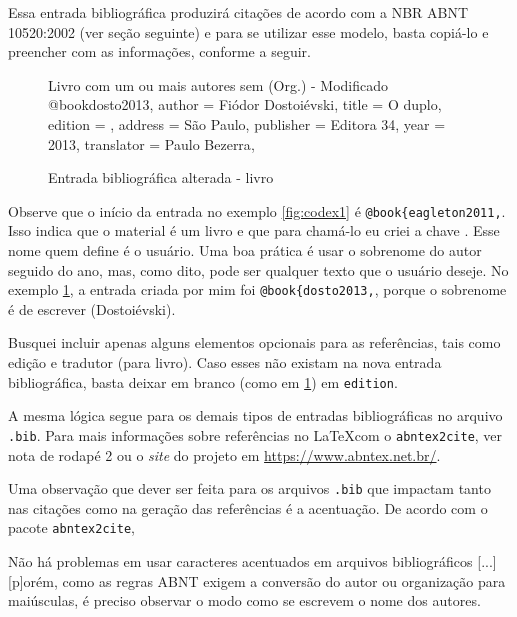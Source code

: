 \documentclass[a4paper,12pt,oneside]{memoir}
\begin{document}
Essa entrada bibliográfica produzirá citações de acordo com a NBR ABNT 10520:2002 (ver seção seguinte) e para se utilizar esse modelo, basta copiá-lo e preencher com as informações, conforme a seguir.

\begin{figure}
\begin{codex}{Livro com um ou mais autores sem (Org.) - Modificado}
@book{dosto2013,
	author     = {Fiódor Dostoiévski},
	title      = {O duplo},
	edition    = {},
	address   = {São Paulo},
	publisher  = {Editora 34},
	year       = {2013},
	translator = {Paulo Bezerra},
}
\end{codex}
\caption{Entrada bibliográfica alterada - livro}
    \label{fig:codex2}
\end{figure}

Observe que o início da entrada no exemplo \ref{fig:codex1} é \verb|@book{eagleton2011,|. Isso indica que o material é um livro e que para chamá-lo eu criei a chave . Esse nome quem define é o usuário. Uma boa prática é usar o sobrenome do autor seguido do ano, mas, como dito, pode ser qualquer texto que o usuário deseje. No exemplo \ref{fig:codex2}, a entrada criada por mim foi \verb|@book{dosto2013,|, porque o sobrenome é  de escrever (Dostoiévski).

Busquei incluir apenas alguns elementos opcionais para as referências, tais como edição e tradutor (para livro). Caso esses não existam na nova entrada bibliográfica, basta deixar em branco (como em \ref{fig:codex2}) em \verb|edition|.

A mesma lógica segue para os demais tipos de entradas bibliográficas no arquivo \verb|.bib|. Para mais informações sobre referências no \LaTeX com o \verb|abntex2cite|, ver nota de rodapé 2 ou o \textit{site} do projeto em \url{https://www.abntex.net.br/}.

Uma observação que dever ser feita para os arquivos \verb|.bib| que impactam tanto nas citações como na geração das referências é a acentuação. De acordo com o pacote \verb|abntex2cite|, 

\begin{citar}
    Não há problemas em usar caracteres acentuados em arquivos bibliográficos [...] [p]orém, como as regras ABNT exigem a conversão do autor ou organização para maiúsculas, é preciso observar o modo como se escrevem o nome dos autores. \cite[p. 8]{abntex2018}
\end{citar}

\end{document}
